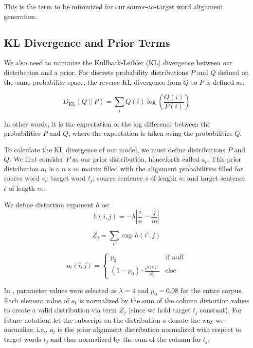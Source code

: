 \documentclass[twoside,twocolumn]{article}
\newlength\mystoreparindent
\newenvironment{myparindent}[1]{%
  \setlength{\mystoreparindent}{\the\parindent}
  \setlength{\parindent}{#1}
  }{%
  \setlength{\parindent}{\mystoreparindent}
}
\begin{document}
\begin{myparindent}{0pt}
This is the term to be minimized for our source-to-target word alignment
generation.


\subsection{KL Divergence and Prior Terms}

We also need to minimize the Kullback-Leibler (KL) divergence between our
distribution and a prior. For discrete probability distributions $P$ and $Q$
defined on the same probability space, the reverse KL divergence from $Q$ to
$P$ is defined as:

\begin{equation}
D_{\mathrm{KL}}(Q \| P) = \sum_{i} Q(i) \log \left( \frac{Q(i)}{P(i)} \right)
\end{equation}

In other words, it is the expectation of the log difference between the
probabilities $P$ and $Q$, where the expectation is taken using the
probabilities $Q$.

To calculate the KL divergence of our model, we must define distributions $P$
and $Q$. We first consider $P$ as our prior distribution, henceforth called
$a_t$. This prior distribution $a_t$ is a $n \times m$ matrix filled with the
alignment probabilities filled for source word $s_i$; target word $t_j$; source
sentence $s$ of length $n$; and target sentence $t$ of length $m$:

We define distortion exponent $h$ as:
\begin{equation}
  h(i, j) = {-\lambda \left| \frac{i}{n} - \frac{j}{m}\right|}
\end{equation}

\begin{equation}
  Z_j = \sum_{i'} \exp h(i', j)
\end{equation}

\begin{equation}
a_t (i, j) =
\begin{cases}
      p_0 & \text{if } null \\
     (1-p_0) \cdot \frac{e^{h(i,j)}}{Z_j} & \text{else}
   \end{cases}
\end{equation}

In \cite{dyer2013simple}, parameter values were selected as $\lambda = 4$ and
$p_0 = 0.08$ for the entire corpus. Each element value of $a_t$ is normalized
by the sum of the column distortion values to create a valid distribution via
term $Z_j$ (since we hold target $t_j$ constant). For future notation, let the
subscript on the distribution $a$ denote the way we normalize, i.e., $a_t$ is
the prior alignment distribution normalized with respect to target words $t_j$
and thus normalized by the sum of the column for $t_j$.


\end{myparindent}
\end{document}
